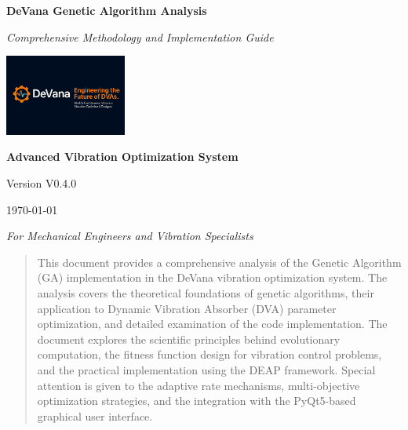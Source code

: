 \documentclass[12pt,a4paper]{article}
\begin{document}
\begin{titlepage}
    \centering
    \vspace*{2cm}
    
    {\Huge\bfseries\color{blue!70!black} DeVana Genetic Algorithm Analysis}
    
    \vspace{1cm}
    
    {\Large\textit{Comprehensive Methodology and Implementation Guide}}
    
    \vspace{2cm}
    
    \includegraphics[width=0.3\textwidth]{../../Logo.png}
    
    \vspace{2cm}
    
    {\large\textbf{Advanced Vibration Optimization System}}
    
    \vspace{0.5cm}
    
    {\large Version V0.4.0}
    
    \vfill
    
    {\large \today}
    
    \vspace{1cm}
    
    {\large\textit{For Mechanical Engineers and Vibration Specialists}}
\end{titlepage}

\tableofcontents
\newpage

\begin{abstract}
This document provides a comprehensive analysis of the Genetic Algorithm (GA) implementation in the DeVana vibration optimization system. The analysis covers the theoretical foundations of genetic algorithms, their application to Dynamic Vibration Absorber (DVA) parameter optimization, and detailed examination of the code implementation. The document explores the scientific principles behind evolutionary computation, the fitness function design for vibration control problems, and the practical implementation using the DEAP framework. Special attention is given to the adaptive rate mechanisms, multi-objective optimization strategies, and the integration with the PyQt5-based graphical user interface.
\end{abstract}
\end{document}
